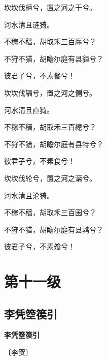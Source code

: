 \documentclass[12pt,UTF-8,openany,fontset=none]{ctexbook}
\begin{document}
\begin{center}
    \begin{Large}

        坎坎伐檀兮，置之河之干兮。

        河水清且涟猗。

        不稼不穑，胡取禾三百廛兮？

        不狩不猎，胡瞻尔庭有县貆兮？

        彼君子兮，不素餐兮！

        \vspace{18pt}  %

        坎坎伐辐兮，置之河之侧兮。

        河水清且直猗。

        不稼不穑，胡取禾三百繶兮？

        不狩不猎，胡瞻尔庭有县特兮？

        彼君子兮，不素食兮！

        \vspace{18pt}  %

        坎坎伐轮兮，置之河之漘兮。

        河水清且沦猗。

        不稼不穑，胡取禾三百囷兮？

        不狩不猎，胡瞻尔庭有县鹑兮？

        彼君子兮，不素飧兮！

    \end{Large}

\end{center}

\vspace{8pt}
\clearpage

\chapter{第十一级}
\clearpage

\section{李凭箜篌引}


\begin{center}
    {\bfseries 李凭箜篌引}

    \vspace{18pt}

    \begin{large}\xuwen
        〔李贺〕
    \end{large}

\end{center}
\end{document}
